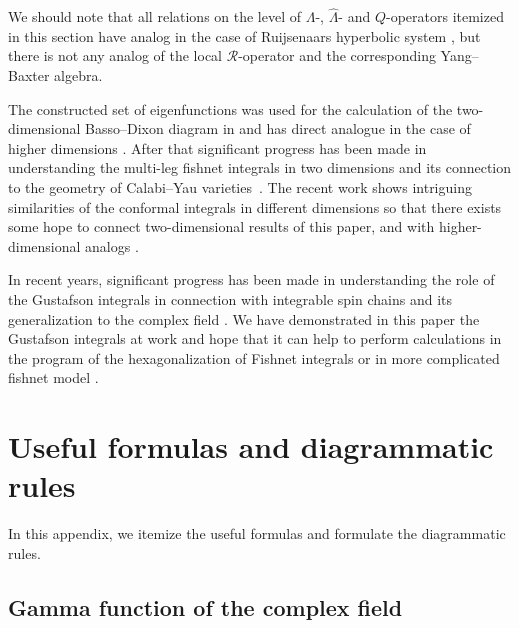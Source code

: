 \documentclass[10pt,a4paper]{amsart}
\numberwithin{equation}{section}
\begin{document}
We should note that all relations on the level of
$\Lambda$-, $\hat{\Lambda}$- and $Q$-operators itemized in this section
have analog in the case of Ruijsenaars hyperbolic system
\cite{BDKK1,BDKK2,BDKK3,BDKK4}, but there is not any analog
of the local $\mathcal{R}$-operator and the
corresponding Yang--Baxter algebra.

The constructed set of eigenfunctions was used for the calculation of the two-dimensional Basso--Dixon diagram in \cite{DKO} and has direct analogue in the case of higher dimensions \cite{DFO,DO1,DO3,DO2}.
After that significant progress has been made in understanding the
multi-leg fishnet integrals in two dimensions and its connection to the geometry
of Calabi--Yau varieties~\mbox{\cite{Duhr1,Duhr2}}.
The recent work \cite{LS} shows intriguing similarities of the conformal integrals in different dimensions so that there exists some hope to connect two-dimensional results of this paper, \cite{Duhr1,Duhr2} and \cite{DKO} with higher-dimensional analogs \cite{BD,BD1,DFO,DO1,DO2,DO3}.

In recent years, significant progress has been made in understanding the role of the Gustafson integrals \cite{G2,G1,G3} in connection with integrable spin chains
\cite{DM,DMV2,DMV1,M} and its generalization to the complex field \cite{DM,DM3,DMV2,DMV1,MN,N,SS0,SS1,SS2}.
We have demonstrated in this paper the Gustafson integrals
at work and hope that it can help to perform calculations in the program of the
hexagonalization of Fishnet integrals \cite{AO, O1,O2} or in more complicated
fishnet model \cite{AFKO}.





\appendix

\section{Useful formulas and diagrammatic rules}
\label{App-DiagTech}


In this appendix, we itemize the useful formulas and
formulate the diagrammatic rules.

\subsection{Gamma function of the complex field}
\end{document}
